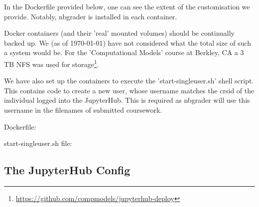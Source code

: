         In the Dockerfile provided below, one can see the extent of the customisation we provide. Notably, nbgrader is installed in each container.
        
        Docker containers (and their 'real' mounted volumes) should be continually backed up. We (as of \today) have not considered what the total size of such a system would be. For the 'Computational Models' course at Berkley, CA a 3 TB NFS was used for storage\footnote{\url{https://github.com/compmodels/jupyterhub-deploy}}.
        
        We have also set up the containers to execute the 'start-singleuser.sh' shell script. This contains code to create a new user, whose username matches the crsid of the individual logged into the JupyterHub. This is required as nbgrader will use this username in the filenames of submitted coursework.
        
        \clearpage
        
        Dockerfile:
        
        
        
        \clearpage
       
        start-singleuser.sh file:
        
        
        \clearpage
    \subsection{The JupyterHub Config}
        
        
        \clearpage